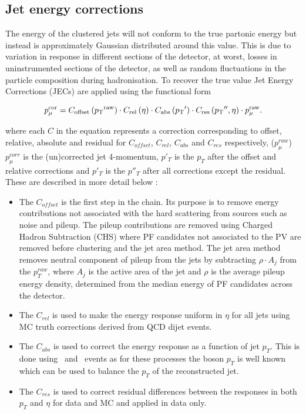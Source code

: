 \subsection{Jet energy corrections}

The energy of the clustered jets will not conform to the true partonic energy but instead is approximately Gaussian distributed around this value.
This is due to variation in response in different sections of the detector, at worst, losses in uninstrumented sections of the detector, as well as 
random fluctuations in the particle composition during hadronisation. To recover the true value Jet Energy Corrections (JECs) are applied using the functional
form \cite{jec}

\begin{equation}
\label{equ:jec}
  p_{\mu}^{\rm{cor}}=C_{\rm{offset}}\left({p_{\text T}}^{\rm{raw}}\right)\cdot C_{\rm{rel}}\left(\eta\right)\cdot C_{\rm{abs}}\left({p_{\text T}}'\right)\cdot C_{\rm{res}}\left({p_{\text T}}'',\eta\right)\cdot p_{\mu}^{\rm{raw}}.
\end{equation}

where each $C$ in the equation represents a correction corresponding to offset, relative, absolute and residual for $C_{offset}$, $C_{rel}$, $C_{abs}$ and $C_{res}$ respectively, 
 ($p_{\mu}^{raw}$) $p_{\mu}^{corr}$ is the (un)corrected jet 4-momentum, $p'_T$ is the $p_T$ after the offset and relative corrections and  $p'_T$ is the $p''_T$ after
all corrections except the residual. These are described in more detail below \cite{jec2}:

\begin{itemize}
\item The $C_{offset}$ is the first step in the chain. Its purpose is to remove energy contributions not associated with the hard scattering from sources
such as noise and pileup. The pileup contributions are removed using Charged Hadron Subtraction (CHS) where PF candidates not associated to the PV
are removed before clustering and the jet area method. The jet area method removes neutral component of pileup from the jets by subtracting $\rho \cdot A_j$
from the $p^{raw}_T$, where $A_j$ is the active area of the jet and $\rho$ is the average pileup energy density, determined from the median energy of PF candidates
across the detector. 
\item The $C_{rel}$ is used to make the energy response uniform in $\eta$ for all jets using MC truth corrections derived from QCD dijet events.
\item The $C_{abs}$ is used to correct the energy response as a function of jet $p_T$. This is done using \zj~and \gj~events as for
these processes the boson $p_T$ is well known which can be used to balance the $p_T$ of the reconstructed jet.
\item The $C_{res}$ is used to correct residual differences between the responses in both $p_T$ and $\eta$ for data and MC and applied in data only.
\end{itemize}

